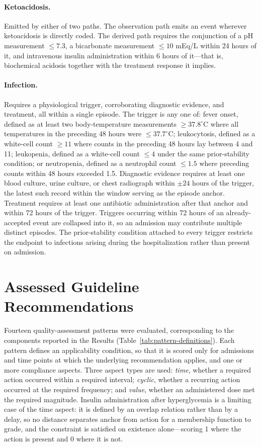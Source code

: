 \paragraph{Ketoacidosis.}
Emitted by either of two paths. The observation path emits an event wherever
ketoacidosis is directly coded. The derived path requires the conjunction of
a pH measurement $\leq7.3$, a bicarbonate measurement $\leq10$ mEq/L within
24 hours of it, and intravenous insulin administration within 6 hours of
it---that is, biochemical acidosis together with the treatment response it
implies.

\paragraph{Infection.}
Requires a physiological trigger, corroborating diagnostic evidence, and
treatment, all within a single episode. The trigger is any one of: fever
onset, defined as at least two body-temperature measurements $\geq37.8^\circ$C
where all temperatures in the preceding 48 hours were $\leq37.7^\circ$C;
leukocytosis, defined as a white-cell count $\geq11$ where counts in the
preceding 48 hours lay between 4 and 11; leukopenia, defined as a white-cell
count $\leq4$ under the same prior-stability condition; or neutropenia,
defined as a neutrophil count $\leq1.5$ where preceding counts within 48
hours exceeded 1.5. Diagnostic evidence requires at least one blood culture,
urine culture, or chest radiograph within $\pm24$ hours of the trigger, the
latest such record within the window serving as the episode anchor.
Treatment requires at least one antibiotic administration after that anchor
and within 72 hours of the trigger. Triggers occurring within 72 hours of an
already-accepted event are collapsed into it, so an admission may contribute
multiple distinct episodes. The prior-stability condition attached to every
trigger restricts the endpoint to infections arising during the
hospitalization rather than present on admission.

\section{Assessed Guideline Recommendations}
\label{app:patterns}

Fourteen quality-assessment patterns were evaluated, corresponding to the
components reported in the Results
(Table~\ref{tab:pattern-definitions}). Each pattern defines an applicability
condition, so that it is scored only for admissions and time points at which
the underlying recommendation applies, and one or more compliance aspects.
Three aspect types are used: \emph{time}, whether a required action occurred
within a required interval; \emph{cyclic}, whether a recurring action
occurred at the required frequency; and \emph{value}, whether an
administered dose met the required magnitude. Insulin administration after
hyperglycemia is a limiting case of the time aspect: it is defined by an
overlap relation rather than by a delay, so no distance separates anchor
from action for a membership function to grade, and the constraint is
satisfied on existence alone---scoring 1 where the action is present and 0
where it is not.


